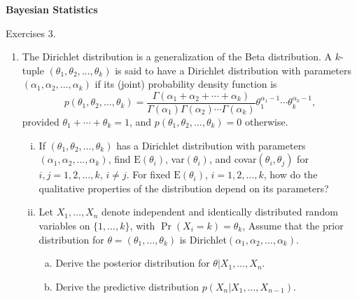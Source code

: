 \documentclass[12pt]{article}
\def\G{\Gamma}
\def\t{\theta}
\def\a{\alpha}
\def\E{\mbox{E}}
\begin{document}
\begin{center}
{\bf
Bayesian Statistics

\smallskip

Exercises 3.
}
\smallskip

\end{center}

\bigskip

\begin{enumerate}

\item The Dirichlet distribution is a generalization of the Beta distribution.  
A $k$-tuple $(\t_1,\t_2,\ldots,\t_k)$ is said to have a Dirichlet distribution with parameters $(\a_1,\a_2,\ldots,\a_k)$ if its (joint) probability density function is
$$p(\t_1,\t_2,\ldots,\t_k) = \frac{\G(\a_1+\a_2+\cdots+\a_k)}{\G(\a_1) \G(\a_2) \cdots \G(\a_k)} \t_1^{\a_1-1}\cdots \t_k^{\a_k-1},$$
provided $\t_1+\cdots+\t_k=1$, and $p(\t_1,\t_2,\ldots,\t_k) = 0$ otherwise.

\begin{enumerate}[i)]
\item If  $(\t_1,\t_2,\ldots,\t_k)$ has a Dirichlet distribution with parameters $(\a_1,\a_2,\ldots,\a_k)$, find $\E(\t_i)$, var$(\t_i)$, and covar$(\t_i,\t_j)$ for $i,j = 1,2, \ldots,k$, $i\ne j$.  For fixed $\E(\t_i)$, $i = 1,2, \ldots,k$, how do the qualitative properties of the distribution depend on its parameters?
\item Let $X_1,\dots,X_n$ denote independent and identically distributed random variables on $\{1,\dots,k\}$, with $\Pr(X_i=k) = \t_k$,
Assume that the prior distribution for $\t=(\t_1,\dots,\t_k)$ is Dirichlet$(\a_1,\a_2,\ldots,\a_k)$. 
\begin{enumerate}[a)]
\item Derive the posterior distribution for $\t | X_1,\dots,X_n$.
\item Derive the predictive distribution $p(X_n | X_1,\dots,X_{n-1})$.
\end{enumerate} 
\end{enumerate}


\end{enumerate}
\end{document}
